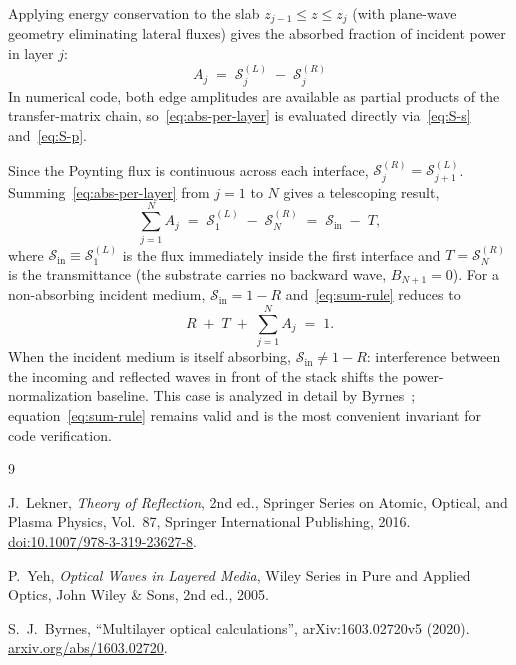 \documentclass[aps,prb,onecolumn,superscriptaddress,nofootinbib,11pt]{revtex4-2}
\begin{document}
Applying energy conservation to the slab $z_{j-1} \le z \le z_j$ (with plane-wave geometry eliminating lateral fluxes) gives the absorbed fraction of incident power in layer $j$:
\begin{equation}
  \boxed{\;
    A_j \;=\; \mathcal{S}^{(L)}_j \;-\;
    \mathcal{S}^{(R)}_j
  \;}
  \label{eq:abs-per-layer}
\end{equation}
In numerical code, both edge amplitudes are available as partial products of the transfer-matrix chain, so~\eqref{eq:abs-per-layer} is evaluated directly via~\eqref{eq:S-s} and~\eqref{eq:S-p}.

Since the Poynting flux is continuous across each interface, $\mathcal{S}^{(R)}_j = \mathcal{S}^{(L)}_{j+1}$. Summing~\eqref{eq:abs-per-layer} from $j = 1$ to $N$ gives a telescoping result,
\begin{equation}
  \sum_{j=1}^{N} A_j
  \;=\; \mathcal{S}^{(L)}_{1} \;-\;
  \mathcal{S}^{(R)}_{N}
  \;=\; \mathcal{S}_\text{in} \;-\; T,
  \label{eq:sum-rule}
\end{equation}
where $\mathcal{S}_\text{in} \equiv \mathcal{S}^{(L)}_1$ is the flux immediately inside the first interface and $T = \mathcal{S}^{(R)}_N$ is the transmittance (the substrate carries no backward wave, $B_{N+1} = 0$). For a non-absorbing incident medium, $\mathcal{S}_\text{in} = 1 - R$ and~\eqref{eq:sum-rule} reduces to
\begin{equation}
  R \;+\; T \;+\; \sum_{j=1}^{N} A_j \;=\; 1.
  \label{eq:RTA-sum}
\end{equation}
When the incident medium is itself absorbing, $\mathcal{S}_\text{in} \neq 1 - R$: interference between the incoming and reflected waves in front of the stack shifts the power-normalization baseline. This case is analyzed in detail by Byrnes~\cite[App.~B]{Byrnes2020}; equation~\eqref{eq:sum-rule} remains valid and is the most convenient invariant for code verification.

\begin{thebibliography}{9}

  J.~Lekner,
  \emph{Theory of Reflection},
  2nd ed.,
  Springer Series on Atomic, Optical, and Plasma Physics,
  Vol.~87,
  Springer International Publishing, 2016.
  \href{https://doi.org/10.1007/978-3-319-23627-8}{doi:10.1007/978-3-319-23627-8}.

  P.~Yeh,
  \emph{Optical Waves in Layered Media},
  Wiley Series in Pure and Applied Optics,
  John Wiley \& Sons, 2nd ed., 2005.

  S.~J.~Byrnes,
  ``Multilayer optical calculations'',
  arXiv:1603.02720v5 (2020).
  \href{https://arxiv.org/abs/1603.02720}{arxiv.org/abs/1603.02720}.

\end{thebibliography}
\end{document}
